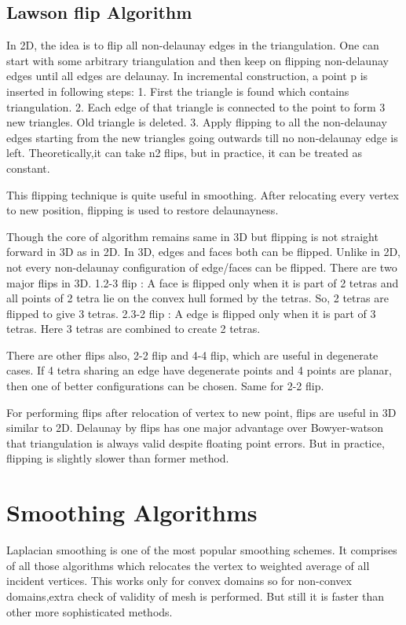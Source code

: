 \subsection{Lawson flip Algorithm}
In 2D, the idea is to flip all non-delaunay edges in the triangulation. One can start with some arbitrary triangulation and then keep on flipping non-delaunay edges until all edges are delaunay. In incremental construction, a point p is inserted in following steps:
1. First the triangle is found which contains triangulation.
2. Each edge of that triangle is connected to the point to form 3 new triangles. Old triangle is deleted.
3. Apply flipping to all the non-delaunay edges starting from the new triangles going outwards till no non-delaunay edge is left. Theoretically,it can take n2 flips, but in practice, it can be treated as constant.

This flipping technique is quite useful in smoothing. After relocating every vertex to new position, flipping is used to restore delaunayness.

Though the core of algorithm remains same in 3D but flipping is not straight forward in 3D as in 2D. In 3D, edges and faces both can be flipped. Unlike in 2D, not every non-delaunay configuration of edge/faces  can be flipped. There are two major flips in 3D. 
1.2-3 flip : A face is flipped only when it is part of 2 tetras and all points of 2 tetra lie on the convex hull formed by the tetras. So, 2 tetras are flipped to give 3 tetras.
2.3-2 flip : A edge is flipped only when it is part of 3 tetras.
Here 3 tetras are combined to create 2 tetras.

There are other flips also, 2-2 flip and 4-4 flip, which are useful in degenerate cases. If 4 tetra sharing an edge have degenerate points and 4 points are planar, then one of better configurations can be chosen. Same for 2-2 flip.

For performing flips after relocation of vertex to new point, flips are useful in 3D similar to 2D. Delaunay by flips has one major advantage over Bowyer-watson that triangulation is always valid despite floating point errors. But in practice, flipping is slightly slower than former method.

\section{Smoothing Algorithms}
Laplacian smoothing is one of the most popular smoothing schemes. It comprises of all those algorithms which relocates the vertex to weighted average of all incident vertices. This works only for convex domains so for non-convex domains,extra check of validity of mesh is performed. But still it is faster than other more sophisticated methods. 

